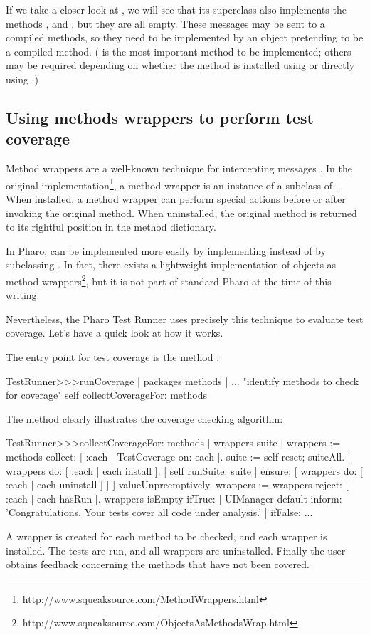 \documentclass[a4paper,10pt,twoside]{book}
\begin{document}
{If we take a closer look at , we will see that its superclass also implements the methods ,  and , but they are all empty.  These messages may be sent to a compiled methods, so they need to be implemented by an object pretending to be a compiled method.  ( is the most important method to be implemented; others may be required depending on whether the method is installed using  or directly using .)

\subsection{Using methods wrappers to perform test coverage}

Method wrappers are a well-known technique for intercepting messages \cite{Bran98a}.
In the original implementation\footnote{http://www.squeaksource.com/MethodWrappers.html}, a method wrapper is an instance of a subclass of . When installed, a method wrapper can perform special actions before or after invoking the original method.
When uninstalled, the original method is returned to its rightful position in the method dictionary.

In Pharo,  can be implemented more easily by implementing  instead of by subclassing . In fact, there exists a lightweight implementation of objects as method wrappers\footnote{http://www.squeaksource.com/ObjectsAsMethodsWrap.html}, but it is not part of standard Pharo at the time of this writing.

Nevertheless, the Pharo Test Runner uses precisely this technique to evaluate test coverage.
Let's have a quick look at how it works.

The entry point for test coverage is the method :
\begin{code}{}
TestRunner>>>runCoverage
	| packages methods |
	... "identify methods to check for coverage"
	self collectCoverageFor: methods
\end{code}

The method  clearly illustrates the coverage checking algorithm:
\begin{code}{}
TestRunner>>>collectCoverageFor: methods
	| wrappers suite |
	wrappers := methods collect: [ :each | TestCoverage on: each ].
	suite := self
		reset;
		suiteAll.
	[ wrappers do: [ :each | each install ].
	  [ self runSuite: suite ] ensure: [ wrappers do: [ :each | each uninstall ] ] ] valueUnpreemptively.
	wrappers := wrappers reject: [ :each | each hasRun ].
	wrappers isEmpty 
		ifTrue: 
			[ UIManager default inform: 'Congratulations. Your tests cover all code under analysis.' ]
		ifFalse: ...
\end{code}
A wrapper is created for each method to be checked, and each wrapper is installed.
The tests are run, and all wrappers are uninstalled.
Finally the user obtains feedback concerning the methods that have not been covered.

}
\end{document}
